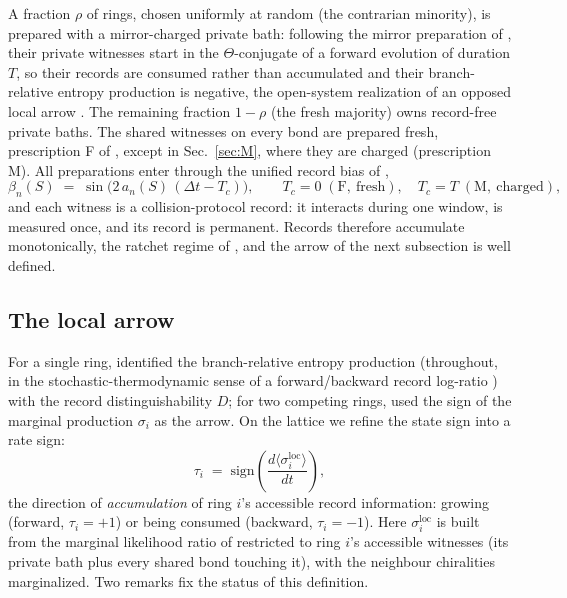 \documentclass[11pt]{article}
\begin{document}
A fraction $\rho$ of rings, chosen uniformly at random (the contrarian
minority), is prepared with a mirror-charged private bath: following the
mirror preparation of \cite{p2}, their private witnesses start in the
$\Theta$-conjugate of a forward evolution of duration $T$, so their records are consumed rather than
accumulated and their branch-relative entropy production is negative, the
open-system realization of an opposed local arrow \cite{guff}. The remaining fraction $1-\rho$ (the fresh majority)
owns record-free private baths. The shared witnesses on every bond are
prepared fresh, prescription F of \cite{p2}, except in Sec.~\ref{sec:M},
where they are charged (prescription M). All preparations enter through the
unified record bias of \cite{p2},
%
\begin{equation}
\beta_n(S) \;=\; \sin\!\big(2\, a_n(S)\, (\Delta t - T_c)\big),
\qquad T_c = 0 \;(\mathrm{F,\ fresh}), \quad T_c = T \;(\mathrm{M,\ charged}),
\label{eq:beta}
\end{equation}
%
and each witness is a collision-protocol record: it interacts during one
window, is measured once, and its record is permanent. Records therefore
accumulate monotonically, the ratchet regime of \cite{p1}, and the arrow of
the next subsection is well defined.

\subsection{The local arrow}
\label{sec:arrow}

For a single ring, \cite{p1} identified the branch-relative entropy
production (throughout, in the stochastic-thermodynamic sense of a
forward/backward record log-ratio \cite{seifert,landi}) with the record
distinguishability $D$; for two competing rings,
\cite{p2} used the sign of the marginal production $\sigma_i$ as the arrow.
On the lattice we refine the state sign into a rate sign:
%
\begin{equation}
\tau_i \;=\; \mathrm{sign}\!\left(\frac{d\langle \sigma_i^{\mathrm{loc}}\rangle}{dt}\right),
\label{eq:tau}
\end{equation}
%
the direction of \emph{accumulation} of ring $i$'s accessible record
information: growing (forward, $\tau_i = +1$) or being consumed (backward,
$\tau_i = -1$). Here $\sigma_i^{\mathrm{loc}}$ is built from the marginal
likelihood ratio of \cite{p2} restricted to ring $i$'s accessible witnesses
(its private bath plus every shared bond touching it), with the neighbour
chiralities marginalized. Two remarks fix the status of this definition.
\end{document}
